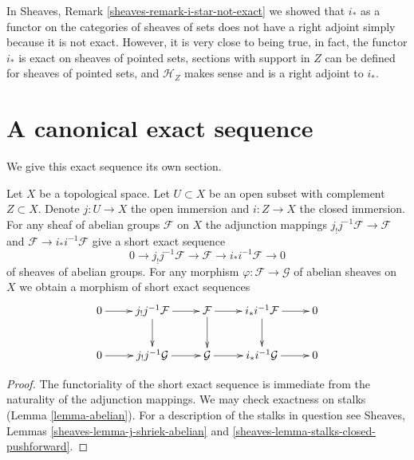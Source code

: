 \begin{remark}
\label{remark-i-star-right-adjoint}
In Sheaves, Remark \ref{sheaves-remark-i-star-not-exact}
we showed that $i_*$ as a functor
on the categories of sheaves of sets
does not have a right adjoint simply because
it is not exact. However, it is very close to being
true, in fact, the functor $i_*$ is exact on sheaves
of pointed sets, sections with support in $Z$ can
be defined for sheaves of pointed sets, and $\mathcal{H}_Z$
makes sense and is a right adjoint to $i_*$.
\end{remark}









\section{A canonical exact sequence}
\label{section-canonical-exact-sequence}

\noindent
We give this exact sequence its own section.

\begin{lemma}
\label{lemma-canonical-exact-sequence}
Let $X$ be a topological space.
Let $U \subset X$ be an open subset with complement $Z \subset X$.
Denote $j : U \to X$ the open immersion and
$i : Z \to X$ the closed immersion.
For any sheaf of abelian groups $\mathcal{F}$ on $X$
the adjunction mappings $j_{!}j^{-1}\mathcal{F} \to \mathcal{F}$ and
$\mathcal{F} \to i_*i^{-1}\mathcal{F}$ give a short exact
sequence
$$
0 \to j_{!}j^{-1}\mathcal{F} \to \mathcal{F} \to i_*i^{-1}\mathcal{F} \to 0
$$
of sheaves of abelian groups. For any morphism
$\varphi : \mathcal{F} \to \mathcal{G}$ of abelian sheaves on $X$
we obtain a morphism of short exact sequences
$$
\xymatrix{
0 \ar[r] &
j_{!}j^{-1}\mathcal{F} \ar[r] \ar[d] &
\mathcal{F} \ar[r] \ar[d] &
i_*i^{-1}\mathcal{F} \ar[r] \ar[d] &
0 \\
0 \ar[r] &
j_{!}j^{-1}\mathcal{G} \ar[r] &
\mathcal{G} \ar[r] &
i_*i^{-1}\mathcal{G} \ar[r] &
0
}
$$
\end{lemma}

\begin{proof}
The functoriality of the short exact sequence is
immediate from the naturality of the adjunction mappings.
We may check exactness on stalks (Lemma \ref{lemma-abelian}).
For a description of the stalks in question see
Sheaves, Lemmas \ref{sheaves-lemma-j-shriek-abelian}
and \ref{sheaves-lemma-stalks-closed-pushforward}.
\end{proof}








